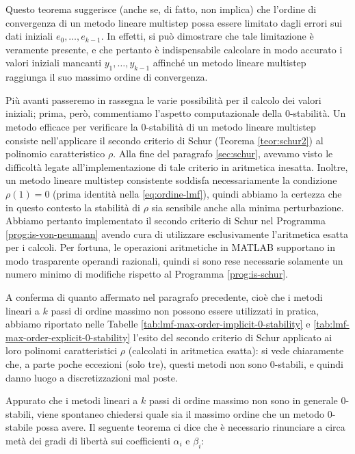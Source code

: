 \noindent Questo teorema suggerisce
(anche se, di fatto, non implica) che l'ordine di convergenza di
un metodo lineare multistep possa essere limitato dagli errori sui
dati iniziali $e_0, \dots, e_{k-1}$.
In effetti, si può dimostrare che tale limitazione è veramente presente,
e che pertanto è indispensabile calcolare in modo accurato i valori iniziali
mancanti $y_1, \dots, y_{k-1}$ affinché un metodo lineare multistep
raggiunga il suo massimo ordine di convergenza.

Più avanti passeremo in rassegna le varie possibilità per il calcolo
dei valori iniziali; prima, però, commentiamo l'aspetto computazionale
della 0-stabilità.
Un metodo efficace per verificare la 0-stabilità di un metodo lineare
multistep consiste nell'applicare il secondo criterio di Schur
(Teorema \ref{teor:schur2}) al polinomio caratteristico $\rho$.
Alla fine del paragrafo \ref{sec:schur}, avevamo visto le difficoltà legate
all'implementazione di tale criterio in aritmetica inesatta.
Inoltre, un metodo lineare multistep consistente soddisfa
necessariamente la condizione $\rho(1) = 0$ (prima identità
nella \eqref{eq:ordine-lmf}), quindi abbiamo la certezza
che in questo contesto la stabilità di $\rho$ sia sensibile anche alla
minima perturbazione. Abbiamo pertanto implementato il secondo criterio
di Schur nel Programma \ref{prog:is-von-neumann} avendo cura di utilizzare
esclusivamente l'aritmetica esatta per i calcoli. Per fortuna,
le operazioni aritmetiche in MATLAB supportano in modo trasparente operandi
razionali, quindi si sono rese necessarie solamente un numero minimo di
modifiche rispetto al Programma \ref{prog:is-schur}.

A conferma di quanto affermato nel paragrafo precedente, cioè
che i metodi lineari a $k$ passi di ordine massimo non possono essere
utilizzati in pratica, abbiamo riportato nelle
Tabelle \ref{tab:lmf-max-order-implicit-0-stability}
e \ref{tab:lmf-max-order-explicit-0-stability}
l'esito del secondo criterio di Schur applicato ai loro polinomi
caratteristici $\rho$ (calcolati in aritmetica esatta):
si vede chiaramente che, a parte poche eccezioni (solo tre),
questi metodi non sono 0-stabili, e quindi danno luogo a discretizzazioni mal poste.

Appurato che i metodi lineari a $k$ passi di ordine massimo non
sono in generale 0-stabili, viene spontaneo chiedersi quale sia il massimo
ordine che un metodo 0-stabile possa avere. Il seguente teorema
ci dice che è necessario rinunciare a circa metà dei gradi di libertà
sui coefficienti $\alpha_i$ e $\beta_i$:

